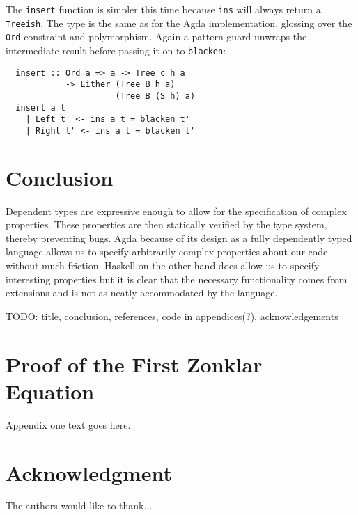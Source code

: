 \documentclass[journal, retainorgcmds]{IEEEtran}
\newcommand{\ihask}[1]{\texttt{#1}}
\begin{document}
The \ihask{insert} function is simpler this time because \ihask{ins} will
always return a \ihask{Treeish}.
The type is the same as for the Agda implementation, glossing over the
\ihask{Ord} constraint and polymorphism.
Again a pattern guard unwraps the intermediate result before passing it on to
\ihask{blacken}:

\begin{verbatim}
  insert :: Ord a => a -> Tree c h a
            -> Either (Tree B h a)
                      (Tree B (S h) a)
  insert a t
    | Left t' <- ins a t = blacken t'
    | Right t' <- ins a t = blacken t'
\end{verbatim}


\section{Conclusion}
Dependent types are expressive enough to allow for the specification of complex
properties.
These properties are then statically verified by the type system, thereby
preventing bugs.
Agda because of its design as a fully dependently typed language allows us to
specify arbitrarily complex properties about our code without much friction.
Haskell on the other hand does allow us to specify interesting properties but
it is clear that the necessary functionality comes from extensions and is not
as neatly accommodated by the language.


TODO: title, conclusion, references, code in appendices(?), acknowledgements

\appendices
\section{Proof of the First Zonklar Equation}
Appendix one text goes here.

\section*{Acknowledgment}


The authors would like to thank...





\end{document}
